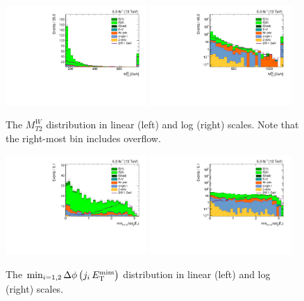 \begin{figure}[htbp]
  \centering
  \includegraphics[width=0.48\textwidth]{figures/semilept-incl-mt2w_l.pdf}
  \includegraphics[width=0.48\textwidth]{figures/semilept-incl-mt2wlog_l.pdf}
  \caption{The $M_{T2}^W$ distribution in linear (left) and log (right) scales. Note that the right-most bin includes overflow.}
  \label{fig:incl_semilept_mt2w}
\end{figure}

\begin{figure}[htbp]
  \centering
  \includegraphics[width=0.48\textwidth]{figures/semilept-incl-dphijetmet2_l.pdf}
  \includegraphics[width=0.48\textwidth]{figures/semilept-incl-dphijetmet2log_l.pdf}
  \caption{The $\min_{i=1,2}\Delta\phi\left(j_i\,E_\mathrm{T}^{\mathrm{miss}}\right)$ distribution in linear (left) and log (right) scales.}
  \label{fig:incl_semilept_dphijetmet2}
\end{figure}

